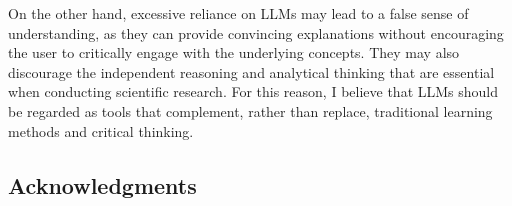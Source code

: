 \documentclass[11pt, a4paper]{article}
\numberwithin{equation}{section}
\begin{document}
On the other hand, excessive reliance on LLMs may lead to a false sense of understanding, as they can provide convincing explanations without encouraging the user to critically engage with the underlying concepts. They may also discourage the independent reasoning and analytical thinking that are essential when conducting scientific research. For this reason, I believe that LLMs should be regarded as tools that complement, rather than replace, traditional learning methods and critical thinking.

\subsection{Acknowledgments}


\newpage


\end{document}
